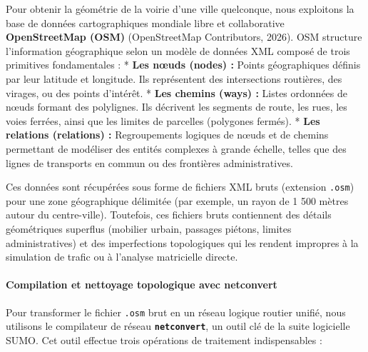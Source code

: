 \documentclass[10pt, a4paper]{article}
\begin{document}
Pour obtenir la géométrie de la voirie d'une ville quelconque, nous
exploitons la base de données cartographiques mondiale libre et
collaborative \textbf{OpenStreetMap (OSM)} (OpenStreetMap Contributors,
2026). OSM structure l'information géographique selon un modèle de
données XML composé de trois primitives fondamentales : * \textbf{Les
nœuds (nodes) :} Points géographiques définis par leur latitude et
longitude. Ils représentent des intersections routières, des virages, ou
des points d'intérêt. * \textbf{Les chemins (ways) :} Listes ordonnées
de nœuds formant des polylignes. Ils décrivent les segments de route,
les rues, les voies ferrées, ainsi que les limites de parcelles
(polygones fermés). * \textbf{Les relations (relations) :} Regroupements
logiques de nœuds et de chemins permettant de modéliser des entités
complexes à grande échelle, telles que des lignes de transports en
commun ou des frontières administratives.

Ces données sont récupérées sous forme de fichiers XML bruts (extension
\texttt{.osm}) pour une zone géographique délimitée (par exemple, un
rayon de 1 500 mètres autour du centre-ville). Toutefois, ces fichiers
bruts contiennent des détails géométriques superflus (mobilier urbain,
passages piétons, limites administratives) et des imperfections
topologiques qui les rendent impropres à la simulation de trafic ou à
l'analyse matricielle directe.

\paragraph{Compilation et nettoyage topologique avec
netconvert}\label{compilation-et-nettoyage-topologique-avec-netconvert}

Pour transformer le fichier \texttt{.osm} brut en un réseau logique
routier unifié, nous utilisons le compilateur de réseau
\textbf{\texttt{netconvert}}, un outil clé de la suite logicielle SUMO.
Cet outil effectue trois opérations de traitement indispensables :
\end{document}
